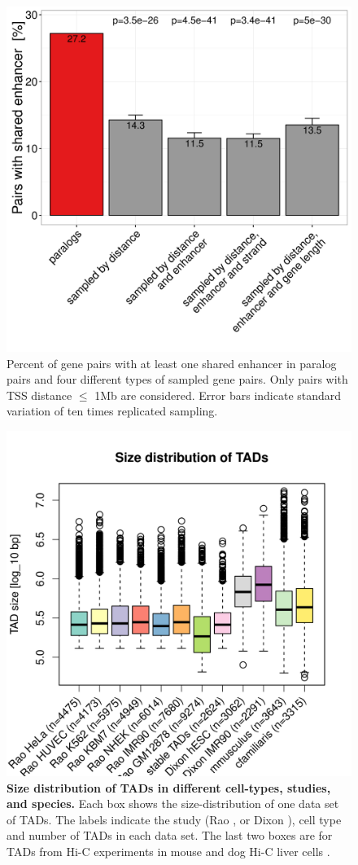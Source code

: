 \documentclass[a4paper,twoside=true,openright,parskip=full,chapterprefix=true,11pt,headings=normal,bibliography=totoc,listof=totoc,titlepage=on,captions=tableabove,draft=false]{scrreprt}
\theoremstyle{definition}
\theoremstyle{definition}
\theoremstyle{definition}
\theoremstyle{remark}
\begin{document}
\begin{figure}

{\centering \includegraphics[width=0.5\linewidth]{figures/paralog/SI/figS7} 

}

\caption{Percent of gene pairs with at least one shared
enhancer in paralog pairs and four different types of sampled gene
pairs. Only pairs with TSS distance \(\leq\) 1Mb are considered. Error
bars indicate standard variation of ten times replicated sampling.}\label{fig:ehBySampType}
\end{figure}






\begin{figure}

{\centering \includegraphics[width=0.5\linewidth]{figures/paralog/SI/figS8} 

}

\caption{\textbf{Size distribution of TADs in different cell-types,
studies, and species.} Each box shows the size-distribution of one data
set of TADs. The labels indicate the study (Rao \citep{Rao2014}, or
Dixon \citep{Dixon2012}), cell type and number of TADs in each data set.
The last two boxes are for TADs from Hi-C experiments in mouse and dog
Hi-C liver cells \citep{VietriRudan2015}.}\label{fig:TADsize}
\end{figure}
\end{document}
